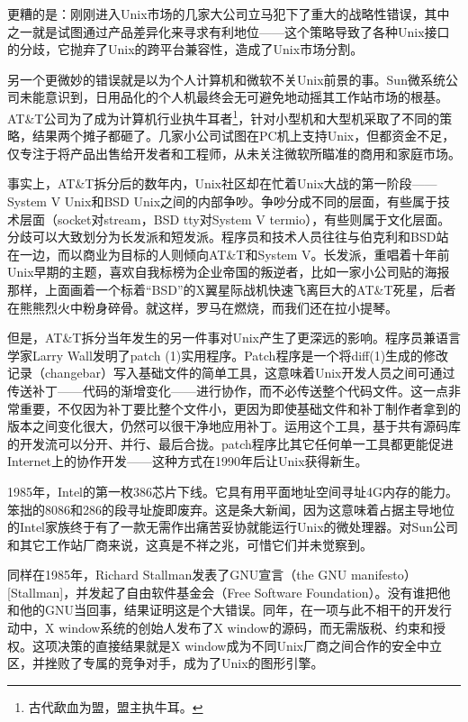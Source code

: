 \documentclass[12pt,oneside]{book}
\begin{document}
\begin{common-format}
更糟的是：刚刚进入Unix市场的几家大公司立马犯下了重大的战略性错误，其中之一就是试图通过产品差异化来寻求有利地位——这个策略导致了各种Unix接口的分歧，它抛弃了Unix的跨平台兼容性，造成了Unix市场分割。

另一个更微妙的错误就是以为个人计算机和微软不关Unix前景的事。Sun微系统公司未能意识到，日用品化的个人机最终会无可避免地动摇其工作站市场的根基。AT\&{}T公司为了成为计算机行业执牛耳者\footnote{古代歃血为盟，盟主执牛耳。}，针对小型机和大型机采取了不同的策略，结果两个摊子都砸了。几家小公司试图在PC机上支持Unix，但都资金不足，仅专注于将产品出售给开发者和工程师，从未关注微软所瞄准的商用和家庭市场。

事实上，AT\&{}T拆分后的数年内，Unix社区却在忙着Unix大战的第一阶段——System V Unix和BSD Unix之间的内部争吵。争吵分成不同的层面，有些属于技术层面（socket对stream，BSD tty对System V termio），有些则属于文化层面。分歧可以大致划分为长发派和短发派。程序员和技术人员往往与伯克利和BSD站在一边，而以商业为目标的人则倾向AT\&{}T和System V。长发派，重唱着十年前Unix早期的主题，喜欢自我标榜为企业帝国的叛逆者，比如一家小公司贴的海报那样，上面画着一个标着“BSD”的X翼星际战机快速飞离巨大的AT\&{}T死星，后者在熊熊烈火中粉身碎骨。就这样，罗马在燃烧，而我们还在拉小提琴。

但是，AT\&{}T拆分当年发生的另一件事对Unix产生了更深远的影响。程序员兼语言学家Larry Wall发明了patch (1)实用程序。Patch程序是一个将diff(1)生成的修改记录（changebar）写入基础文件的简单工具，这意味着Unix开发人员之间可通过传送补丁——代码的渐增变化——进行协作，而不必传送整个代码文件。这一点非常重要，不仅因为补丁要比整个文件小，更因为即使基础文件和补丁制作者拿到的版本之间变化很大，仍然可以很干净地应用补丁。运用这个工具，基于共有源码库的开发流可以分开、并行、最后合拢。patch程序比其它任何单一工具都更能促进Internet上的协作开发——这种方式在1990年后让Unix获得新生。

1985年，Intel的第一枚386芯片下线。它具有用平面地址空间寻址4G内存的能力。笨拙的8086和286的段寻址旋即废弃。这是条大新闻，因为这意味着占据主导地位的Intel家族终于有了一款无需作出痛苦妥协就能运行Unix的微处理器。对Sun公司和其它工作站厂商来说，这真是不祥之兆，可惜它们并未觉察到。

同样在1985年，Richard Stallman发表了GNU宣言（the GNU manifesto）[Stallman]，并发起了自由软件基金会（Free Software Foundation）。没有谁把他和他的GNU当回事，结果证明这是个大错误。同年，在一项与此不相干的开发行动中，X window系统的创始人发布了X window的源码，而无需版税、约束和授权。这项决策的直接结果就是X window成为不同Unix厂商之间合作的安全中立区，并挫败了专属的竞争对手，成为了Unix的图形引擎。


\end{common-format}
\end{document}
